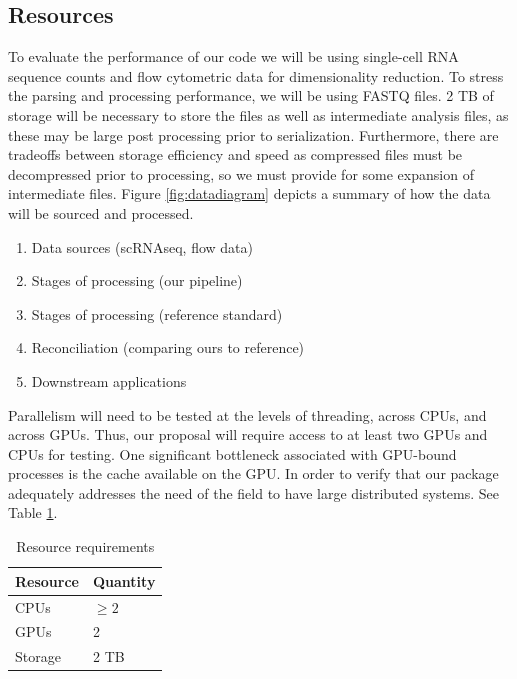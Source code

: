 \documentclass[10pt,letterpaper]{article}
\providecommand{\tightlist}{%
  \setlength{\itemsep}{0pt}\setlength{\parskip}{0pt}}
\begin{document}
\begin{multicols}{2}
\subsection{Resources}


To evaluate the performance of our code we will be using single-cell
RNA sequence counts and flow cytometric data for dimensionality
reduction. To stress the parsing and processing performance, we will
be using FASTQ files. 2 TB of storage will be necessary to store the
files as well as intermediate analysis files, as these may be large
post processing prior to serialization. Furthermore, there are
tradeoffs between storage efficiency and speed as compressed files
must be decompressed prior to processing, so we must provide for some
expansion of intermediate files. Figure \ref{fig:datadiagram} depicts a summary of how the data
will be sourced and processed.

\begin{enumerate} \tightlist
\item Data sources (scRNAseq, flow data)
\item Stages of processing (our pipeline)
\item Stages of processing (reference standard)
\item Reconciliation (comparing ours to reference)
\item Downstream applications
\end{enumerate}

Parallelism will need to be tested at the levels of threading, across
CPUs, and across GPUs. Thus, our proposal will require access to at
least two GPUs and CPUs for testing. One significant bottleneck
associated with GPU-bound processes is the cache available on the
GPU. In order to verify that our package adequately addresses the need
of the field to have large distributed systems. See Table
\ref{table:resources}.
\end{multicols}

\begin{table}[h]
  \begin{minipage}[b]{0.48\linewidth}
  \centering
  \begin{tabular}[l]{|l l|}
  \hline
  Resource & Quantity \\
  \hline
  CPUs & $\geq 2$ \\
  GPUs & 2 \\
  Storage & 2 TB \\
  \hline
\end{tabular}\\
\caption{Resource requirements}
\label{table:resources}
\end{minipage}
\end{table}
\end{document}
